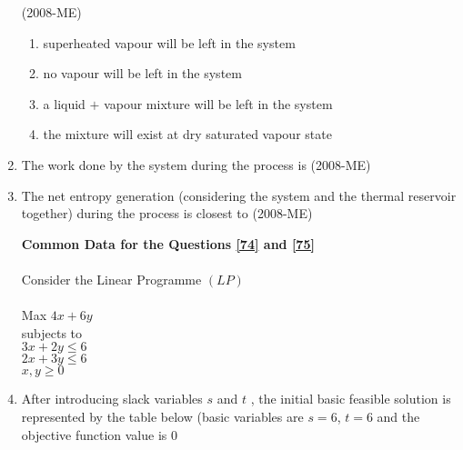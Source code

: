 \documentclass[journal]{IEEEtran}
\begin{document}
\begin{enumerate}
 \hfill(2008-ME)
 \begin{enumerate}
     \item superheated vapour will be left in the system 
     \item no vapour will be left in the system 
     \item a liquid $+$ vapour mixture will be left in the system 
     \item the mixture will exist at dry saturated vapour state 
 \end{enumerate}
 \item The work done by the system during the process is \hfill(2008-ME) \label{72} 
 \begin{enumerate}
 \end{enumerate}
\item The net entropy generation (considering the system and the thermal reservoir together) during the process is closest to \label{73} \hfill(2008-ME)
\begin{enumerate}
\end{enumerate}
\textbf{Common Data for the Questions \ref{74} and \ref{75}} \\ \\
Consider the Linear Programme $(LP)$ \\ \\
Max $4x+6y$ \\ subjects to \\ $3x+2y \leq 6$ \\ $2x+3y \leq 6$ \\
$x,y \geq 0$ \\ 
\item After introducing slack variables $s$
 and $t$
, the initial basic feasible solution is represented by the table below (basic variables are $s = 6$, $t = 6$
 and the objective function value is $0$

\end{enumerate}
\end{document}
